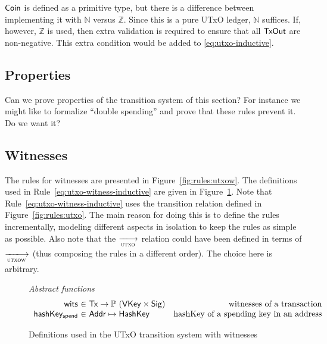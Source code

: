 \documentclass[11pt,a4paper]{article}
\newcommand{\Tx}{\type{Tx}}
\newcommand{\Addr}{\type{Addr}}
\newcommand{\Coin}{\type{Coin}}
\newcommand{\TxOut}{\type{TxOut}}
\newcommand{\VKey}{\type{VKey}}
\newcommand{\HashKey}{\type{HashKey}}
\newcommand{\Sig}{\type{Sig}}
\theoremstyle{definition}
\theoremstyle{definition}
\begin{document}
\begin{note}
  $\Coin$ is defined as a primitive type, but there is a difference
  between implementing it with $\mathbb{N}$ versus $\mathbb{Z}$.
  Since this is a pure UTxO ledger, $\mathbb{N}$ suffices.
  If, however, $\mathbb{Z}$ is used, then extra validation is required
  to ensure that all $\TxOut$ are non-negative.
  This extra condition would be added to \cref{eq:utxo-inductive}.
\end{note}

\subsection{Properties}
\label{sec:utxo-properties}

\begin{todo}
  Can we prove properties of the transition system of this section? For
  instance we might like to formalize ``double spending'' and prove that these
  rules prevent it. Do we want it?
\end{todo}

\subsection{Witnesses}
\label{sec:witnesses}

The rules for witnesses are presented in Figure~\ref{fig:rules:utxow}.
The definitions used in Rule~\ref{eq:utxo-witness-inductive} are given in
Figure~\ref{fig:defs:utxow}. Note that
Rule~\ref{eq:utxo-witness-inductive} uses the transition relation defined in
Figure~\ref{fig:rules:utxo}. The main reason for doing this is to define
the rules incrementally, modeling different aspects in isolation to keep the
rules as simple as possible. Also note that the $\trans{utxo}{}$ relation could
have been defined in terms of $\trans{utxow}{}$ (thus composing the rules in a
different order). The choice here is arbitrary.

\begin{figure}
  \emph{Abstract functions}
  \begin{equation*}
    \begin{array}{r@{~\in~}lr}
      \fun{wits} & \Tx \to \powerset{(\VKey \times \Sig)}
      & \text{witnesses of a transaction}\\
      \fun{hashKey_{spend}} & \Addr \mapsto \HashKey
      & \text{hashKey of a spending key in an address}\\
    \end{array}
  \end{equation*}
  \caption{Definitions used in the UTxO transition system with witnesses}
  \label{fig:defs:utxow}
\end{figure}
\end{document}
